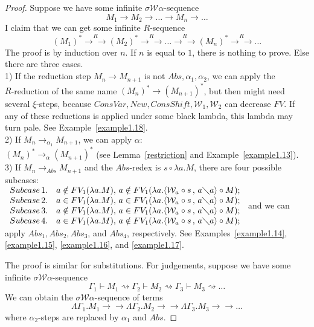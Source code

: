 \documentclass[11pt]{amsart}
\theoremstyle{plain}
\theoremstyle{definition}
\theoremstyle{remark}
\numberwithin{equation}{section}
\newcommand{\ci}{\circ}
\newcommand{\ri}{\rightsquigarrow}
\newcommand{\mi}{\,,\,}
\newcommand{\is}{\diagdown}
\newcommand{\arrow}{\rightarrow}
\newcommand{\twoh}{\arrow\arrow}
\newcommand{\x}{a}
\renewcommand{\pi}{\mathcal{W}}
\begin{document}
\begin{proof}Suppose we have some infinite $\sigma\pi\alpha$-sequence
$$ M_1\arrow M_2\arrow\ldots\arrow M_n\arrow\ldots$$
 I claim that we can get
some
infinite  $R$-sequence\\
$$(M_1)^*\overset{R}{\twoh}(M_2)^*\overset{R}{\twoh}\ldots\overset{R}{\twoh}(M_n)^*\overset{R}{\twoh}\ldots$$
The proof is by induction over $n$. If $n$ is equal to $1$, there is nothing to prove. Else there are three cases.\\[5pt]
1)  If the reduction step $ M_n\arrow M_{n+1}$ is not
$Abs,\alpha_1,\alpha_2$, we can apply the\\ $R$-reduction of the
same name $(M_n)^*\arrow( M_{n+1})^*$, but then might need several
$\xi$-steps, because $ConsVar, New, ConsShift,\pi_1,\pi_2$ can
decrease $FV$. If any of these reductions is applied under some
black lambda, this lambda may
turn pale. See Example~\ref{example1.18}.\\[5pt]
2) If  $M_n\arrow_{\alpha_1} M_{n+1}$,
we can apply $\alpha$:\\
$(M_n)^*\arrow_{\alpha}(M_{n+1})^*$ (see Lemma~\ref{restriction}
and
Example~\ref{example1.13}).\\[5pt]
3) If $ M_n\arrow_{Abs} M_{n+1}$ and the $Abs$-redex is
$s\ci\lambda \x.M$, there are four
possible subcases:\\
$
\begin{array}{lll}
Subcase \,1. & \x\notin FV_1(\lambda \x.M),\, \x\notin
FV_1(\lambda
\x.\langle \pi_{\x}\ci s\mi \x\is \x\rangle\ci M);\\
Subcase\, 2. & \x\in FV_1(\lambda \x.M),\, \x\in FV_1(\lambda
\x.\langle \pi_{\x}\ci s\mi \x\is \x\rangle\ci M);\\
Subcase\, 3. & \x\notin FV_1(\lambda \x.M),\, \x\in FV_1(\lambda
\x.\langle \pi_{\x}\ci s\mi \x\is \x\rangle\ci M);\\
Subcase \,4. & \x\in FV_1(\lambda \x.M),\, \x\notin FV_1(\lambda
\x.\langle \pi_{\x}\ci s\mi \x\is \x\rangle\ci M);
\end{array}\\[3pt]
$ and we can apply $Abs_1, Abs_2, Abs_3$, and $Abs_4$,
respectively. See Examples~\ref{example1.14}, \ref{example1.15},
\ref{example1.16}, and \ref{example1.17}.

The proof is similar for substitutions. For judgements, suppose we
have some infinite $\sigma\pi\alpha$-sequence
$$\Gamma_1\vdash M_1\ri\Gamma_2\vdash  M_2\ri\Gamma_3\vdash M_3\ri\ldots$$
We can obtain the $\sigma\pi\alpha$-sequence of terms
$$\Lambda\Gamma_1.M_1\twoh\Lambda\Gamma_2.M_2\twoh\Lambda\Gamma_3.M_3\twoh\ldots$$
where $\alpha_2$-steps are replaced by $\alpha_1$ and $Abs$.
\end{proof}
\end{document}
